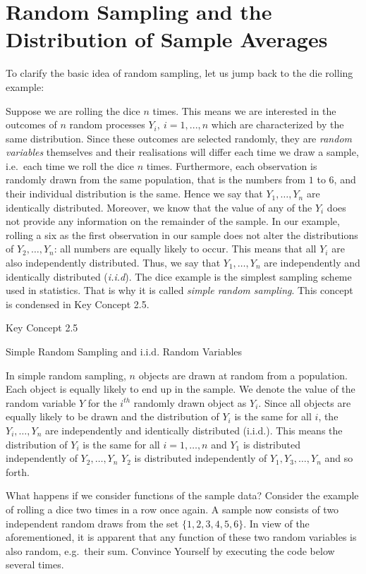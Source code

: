 \documentclass[]{book}
\theoremstyle{definition}
\theoremstyle{definition}
\theoremstyle{definition}
\theoremstyle{remark}
\begin{document}
\section{Random Sampling and the Distribution of Sample
Averages}\label{random-sampling-and-the-distribution-of-sample-averages}

To clarify the basic idea of random sampling, let us jump back to the
die rolling example:

Suppose we are rolling the dice \(n\) times. This means we are
interested in the outcomes of \(n\) random processes
\(Y_i, \ i=1,...,n\) which are characterized by the same distribution.
Since these outcomes are selected randomly, they are \emph{random
variables} themselves and their realisations will differ each time we
draw a sample, i.e.~each time we roll the dice \(n\) times. Furthermore,
each observation is randomly drawn from the same population, that is the
numbers from \(1\) to \(6\), and their individual distribution is the
same. Hence we say that \(Y_1,\dots,Y_n\) are identically distributed.
Moreover, we know that the value of any of the \(Y_i\) does not provide
any information on the remainder of the sample. In our example, rolling
a six as the first observation in our sample does not alter the
distributions of \(Y_2,\dots,Y_n\): all numbers are equally likely to
occur. This means that all \(Y_i\) are also independently distributed.
Thus, we say that \(Y_1,\dots,Y_n\) are independently and identically
distributed (\emph{i.i.d}). The dice example is the simplest sampling
scheme used in statistics. That is why it is called \emph{simple random
sampling}. This concept is condensed in Key Concept 2.5.

Key Concept 2.5

Simple Random Sampling and i.i.d. Random Variables

In simple random sampling, \(n\) objects are drawn at random from a
population. Each object is equally likely to end up in the sample. We
denote the value of the random variable \(Y\) for the \(i^{th}\)
randomly drawn object as \(Y_i\). Since all objects are equally likely
to be drawn and the distribution of \(Y_i\) is the same for all \(i\),
the \(Y_i, \dots, Y_n\) are independently and identically distributed
(i.i.d.). This means the distribution of \(Y_i\) is the same for all
\(i=1,\dots,n\) and \(Y_1\) is distributed independently of
\(Y_2, \dots, Y_n\) \(Y_2\) is distributed independently of
\(Y_1, Y_3, \dots, Y_n\) and so forth.

What happens if we consider functions of the sample data? Consider the
example of rolling a dice two times in a row once again. A sample now
consists of two independent random draws from the set
\(\{1,2,3,4,5,6\}\). In view of the aforementioned, it is apparent that
any function of these two random variables is also random, e.g.~their
sum. Convince Yourself by executing the code below several times.
\end{document}
